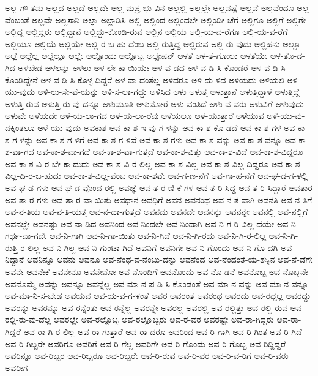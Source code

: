 {ಅಲ್ಲ-ಗೌ-ತಮ
ಅಲ್ಲದ
ಅಲ್ಲದೆ
ಅಲ್ಲದೇ
ಅಲ್ಲ-ಮಪ್ರ-ಭು-ವಿನ
ಅಲ್ಲಲ್ಲಿ
ಅಲ್ಲಲ್ಲೇ
ಅಲ್ಲವಷ್ಟೆ
ಅಲ್ಲವೆ
ಅಲ್ಲವೆಂದೂ
ಅಲ್ಲ-ವೆಂಬಂತೆ
ಅಲ್ಲವೇ
ಅಲ್ಲಸಾನಿ
ಅಲ್ಲಾ
ಅಲ್ಲಾಡಿಸಿ
ಅಲ್ಲಿ
ಅಲ್ಲಿಂದ
ಅಲ್ಲಿಂದಲೇ
ಅಲ್ಲಿಂದೀ-ಚೆಗೆ
ಅಲ್ಲಿಗೂ
ಅಲ್ಲಿಗೆ
ಅಲ್ಲಿಗೇ
ಅಲ್ಲಿದ್ದ
ಅಲ್ಲಿದ್ದರು
ಅಲ್ಲಿದ್ದಾನೆ
ಅಲ್ಲಿದ್ದು-ಕೊಂಡಿ-ರುವ
ಅಲ್ಲಿನ
ಅಲ್ಲಿಯ
ಅಲ್ಲಿ-ಯ-ವ-ರೆಗೂ
ಅಲ್ಲಿ-ಯ-ವ-ರೆಗೆ
ಅಲ್ಲಿಯೂ
ಅಲ್ಲಿಯೆ
ಅಲ್ಲಿಯೇ
ಅಲ್ಲಿ-ರ-ಬ-ಹು-ದೆಂಬ
ಅಲ್ಲಿ-ರುತ್ತಿದ್ದ
ಅಲ್ಲಿರುವ
ಅಲ್ಲಿ-ರು-ವುದು
ಅಲ್ಲಿಹನು
ಅಲ್ಲೂ
ಅಲ್ಲೆ
ಅಲ್ಲೆಲ್ಲ
ಅಲ್ಲೆಲ್ಲೂ
ಅಲ್ಲೇ
ಅಲ್ಲೊಂದು
ಅಲ್ಲೊಬ್ಬ
ಅಲ್ಸೇಷನ್
ಅಳತೆ
ಅಳ-ತೆ-ಗೋಲು
ಅಳತೆಯೇ
ಅಳ-ತೊ-ಡ-ಗಿದ
ಅಳಬೇಡ
ಅಳಲನ್ನು
ಅಳಲು
ಅಳ-ಲೇ-ಕಾ-ಯಿಯೇ
ಅಳ-ವ-ಡದ
ಅಳ-ವ-ಡಿ-ಸಿ-ಕೊಂಡರೆ
ಅಳ-ವ-ಡಿ-ಸಿ-ಕೊಂಡಿದ್ದೇನೆ
ಅಳ-ವ-ಡಿ-ಸಿ-ಕೊಳ್ಳ-ದಿದ್ದರೆ
ಅಳ-ವಾ-ದಂತೆಲ್ಲ
ಅಳಿದರೂ
ಅಳಿ-ದು-ಳಿದ
ಅಳಿಯದು
ಅಳಿಯಲಿ
ಅಳಿ-ಯು-ವುದು
ಅಳಿ-ಲು-ಸೇ-ವೆ-ಯನ್ನು
ಅಳಿ-ಸ-ಲಾ-ಗದ್ದು
ಅಳಿಸಿದ
ಅಳು
ಅಳುತ್ತ
ಅಳುತ್ತಾನೆ
ಅಳುತ್ತಿದ್ದಾಳೆ
ಅಳುತ್ತಿದ್ದೆ
ಅಳುತ್ತಿ-ರುವ
ಅಳುತ್ತಿ-ರು-ವು-ದನ್ನೂ
ಅಳುಮೂತಿ
ಅಳುಮೋರೆ
ಅಳು-ವಂತಿದೆ
ಅಳು-ವ-ವರು
ಅಳುವಿಗೆ
ಅಳುವುದು
ಅಳುವೇ
ಅಳೆಯದೇ
ಅಳೆ-ಯ-ಲಾ-ಗದ
ಅಳೆ-ಯ-ಲಾ-ರೆವು
ಅಳೆಯಲೂ
ಅಳೆ-ಯುತ್ತಾರೆ
ಅಳೆಯುವ
ಅಳೆ-ಯು-ವು-ದಕ್ಕಿಂತಲೂ
ಅಳೆ-ಯು-ವುದು
ಅವಕಾಶ
ಅವ-ಕಾ-ಶ-ಇ-ವು-ಗ-ಳನ್ನು
ಅವ-ಕಾ-ಶ-ಕೊ-ಡದೆ
ಅವ-ಕಾ-ಶ-ಗಳ
ಅವ-ಕಾ-ಶ-ಗ-ಳನ್ನು
ಅವ-ಕಾ-ಶ-ಗ-ಳಿಗೆ
ಅವ-ಕಾ-ಶ-ಗ-ಳಿವೆ
ಅವ-ಕಾ-ಶ-ಗಳು
ಅವ-ಕಾ-ಶ-ವನ್ನು
ಅವ-ಕಾ-ಶ-ವನ್ನೂ
ಅವ-ಕಾ-ಶ-ವಾ-ಗದ
ಅವ-ಕಾ-ಶ-ವಾ-ಗದೆ
ಅವ-ಕಾ-ಶ-ವಾ-ಗುತ್ತದೆ
ಅವ-ಕಾ-ಶ-ವಿತ್ತು
ಅವ-ಕಾ-ಶ-ವಿದೆ
ಅವ-ಕಾ-ಶ-ವಿದ್ದರೂ
ಅವ-ಕಾ-ಶ-ವಿ-ರ-ಬೇ-ಕಾ-ದುದು
ಅವ-ಕಾ-ಶ-ವಿ-ರ-ಲಿಲ್ಲ
ಅವ-ಕಾ-ಶ-ವಿಲ್ಲ
ಅವ-ಕಾ-ಶ-ವಿಲ್ಲ-ದಿದ್ದರೂ
ಅವ-ಕಾ-ಶ-ವಿಲ್ಲ-ದಿ-ರ-ಬ-ಹುದು
ಅವ-ಕಾ-ಶ-ವಿಲ್ಲ-ವೆಂಬ
ಅವ-ಕಾ-ಶವೇ
ಅವ-ಗ-ಣ-ನೆಗೆ
ಅವ-ಗಾ-ಹ-ನೆಗೆ
ಅವ-ಘ-ಡ-ಗ-ಳಲ್ಲಿ
ಅವ-ಘ-ಡ-ಗಳು
ಅವ-ಘ-ಡ-ವೊಂದ-ರಲ್ಲಿ
ಅವಜ್ಞೆ
ಅವ-ತ-ರ-ಣಿ-ಕೆ-ಗಳ
ಅವ-ತ-ರಿ-ಸಿದ್ದ
ಅವ-ತ-ರಿ-ಸಿದ್ದಾರೆ
ಅವತಾರ
ಅವ-ತಾ-ರ-ಗಳು
ಅವ-ತಾ-ರ-ವಾ-ಯಿತು
ಅವಧಾನ
ಅವಧಿಗೆ
ಅವನ
ಅವನಂಥ
ಅವ-ನ-ತ-ವಾಗಿ
ಅವನತಿ
ಅವ-ನ-ತಿಗೆ
ಅವ-ನ-ತಿಯ
ಅವ-ನ-ತಿ-ಯತ್ತ
ಅವ-ನ-ದಾ-ಗುತ್ತದೆ
ಅವನದು
ಅವನದೇ
ಅವನನ್ನು
ಅವನನ್ನೇ
ಅವನಲ್ಲಿ
ಅವ-ನಲ್ಲಿಗೆ
ಅವನಲ್ಲೇ
ಅವನಷ್ಟು
ಅವ-ನಾ-ಡಿದ
ಅವನಿಂದ
ಅವ-ನಿಂದಲೇ
ಅವ-ನಿಂದಾಗಿ
ಅವ-ನಿ-ಗ-ರಿ-ವಿಲ್ಲ-ದೆಯೇ
ಅವ-ನಿ-ಗರ್ಥ-ವಾ-ಗದೇ
ಅವ-ನಿ-ಗಾಗಿ
ಅವ-ನಿ-ಗಾ-ಯಿತು
ಅವ-ನಿ-ಗಿದೆ
ಅವ-ನಿ-ಗಿ-ರದು
ಅವ-ನಿ-ಗಿ-ರ-ಲಿಲ್ಲ
ಅವ-ನಿ-ಗಿ-ರುತ್ತಿ-ರ-ಲಿಲ್ಲ
ಅವ-ನಿ-ಗಿಲ್ಲ
ಅವ-ನಿ-ಗುಂಟಾ-ಗಿದೆ
ಅವನಿಗೆ
ಅವನಿಗೇ
ಅವ-ನಿ-ಗೊಂದು
ಅವ-ನಿ-ಗೊ-ದಗಿ
ಅವ-ನಿದ್ದಾನೆ
ಅವನಿನ್ನೂ
ಅವನು
ಅವನೂ
ಅವ-ನೆಂಥ-ವ-ನೆಂಬು-ದನ್ನು
ಅವನೆಂದ
ಅವ-ನೆಂದಂತೆ-ಯ-ಶಸ್ಸಿನ
ಅವ-ನೆ-ಡೆಗೇ
ಅವನೇ
ಅವನೇಕೆ
ಅವನೇನೂ
ಅವನೇನೋ
ಅವ-ನೊಂದಿಗೆ
ಅವನೊಂದು
ಅವ-ನೊ-ಡನೆ
ಅವನೊಬ್ಬ
ಅವ-ನೊಬ್ಬನೇ
ಅವನೊಮ್ಮೆ
ಅವನ್ನು
ಅವನ್ನೂ
ಅವನ್ನೆಲ್ಲ
ಅವ-ಮಾ-ನ-ಪ-ಡಿ-ಸಿ-ಕೊಂಡಂತೆ
ಅವ-ಮಾ-ನ-ವನ್ನು
ಅವ-ಮಾ-ನ-ವನ್ನೂ
ಅವ-ಮಾ-ನಿ-ಸ-ಬೇಡ
ಅವಯವ
ಅವ-ಯ-ವ-ಗ-ಳಂತೆ
ಅವರ
ಅವರಂತೆ
ಅವರಂಥ
ಅವರದು
ಅವ-ರದ್ದಲ್ಲ
ಅವರದ್ದು
ಅವರನ್ನು
ಅವರನ್ನೂ
ಅವ-ರನ್ನೆಂತು
ಅವ-ರನ್ನೆಲ್ಲ
ಅವರನ್ನೇ
ಅವರಲ್ಲ
ಅವರಲ್ಲಿ
ಅವ-ರಲ್ಲಿತ್ತು
ಅವ-ರಲ್ಲಿ-ರುವ
ಅವ-ರಲ್ಲಿ-ರು-ವು-ದೆಲ್ಲ
ಅವರಲ್ಲೇ
ಅವ-ರಲ್ಲೊಬ್ಬ
ಅವ-ರಲ್ಲೊಬ್ಬರು
ಅವ-ರ-ವರ
ಅವರಷ್ಟೇ
ಅವ-ರಾ-ಗಿದ್ದರು
ಅವ-ರಾ-ಗಿದ್ದರೆ
ಅವ-ರಾ-ಗಿ-ರ-ಲಿಲ್ಲ
ಅವ-ರಾ-ಗುತ್ತಾರೆ
ಅವ-ರಾ-ದರೂ
ಅವರಿಂದ
ಅವ-ರಿ-ಗಾಗಿ
ಅವ-ರಿ-ಗಿಂತ
ಅವ-ರಿ-ಗಿದೆ
ಅವ-ರಿ-ಗಿಬ್ಬರೇ
ಅವರಿಗೂ
ಅವರಿಗೆ
ಅವ-ರಿ-ಗೆಲ್ಲ
ಅವರಿಗೇ
ಅವ-ರಿ-ಗೊಂದು
ಅವ-ರಿ-ಗೊಬ್ಬ
ಅವ-ರಿದ್ದಿದ್ದರೆ
ಅವರಿನ್ನೂ
ಅವ-ರಿಬ್ಬರ
ಅವ-ರಿಬ್ಬರೂ
ಅವ-ರಿಬ್ಬರೇ
ಅವ-ರಿ-ರುವ
ಅವ-ರಿ-ವರ
ಅವ-ರಿ-ವ-ರಿಗೆ
ಅವ-ರಿ-ವರು
ಅವರೀಗ
}
